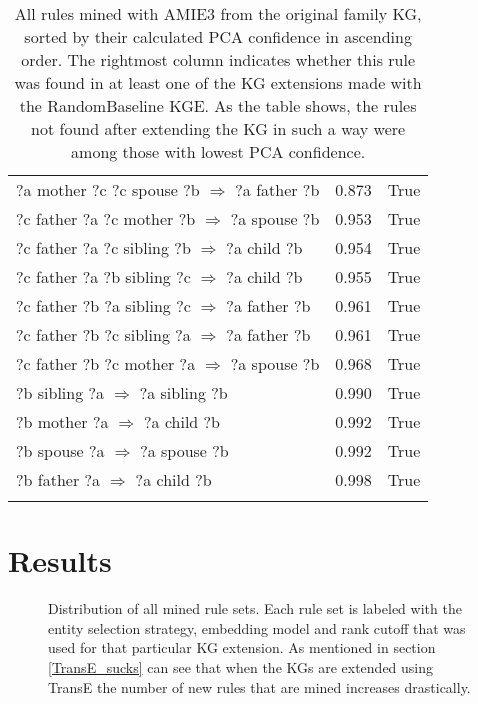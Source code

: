 \begin{longtable}{lrl}
      ?a  mother  ?c  ?c  spouse  ?b   $\Rightarrow$ ?a  father  ?b &           0.873 &                     True \\
      ?c  father  ?a  ?c  mother  ?b   $\Rightarrow$ ?a  spouse  ?b &           0.953 &                     True \\
      ?c  father  ?a  ?c  sibling  ?b   $\Rightarrow$ ?a  child  ?b &           0.954 &                     True \\
      ?c  father  ?a  ?b  sibling  ?c   $\Rightarrow$ ?a  child  ?b &           0.955 &                     True \\
     ?c  father  ?b  ?a  sibling  ?c   $\Rightarrow$ ?a  father  ?b &           0.961 &                     True \\
     ?c  father  ?b  ?c  sibling  ?a   $\Rightarrow$ ?a  father  ?b &           0.961 &                     True \\
      ?c  father  ?b  ?c  mother  ?a   $\Rightarrow$ ?a  spouse  ?b &           0.968 &                     True \\
                    ?b  sibling  ?a   $\Rightarrow$ ?a  sibling  ?b &           0.990 &                     True \\
                       ?b  mother  ?a   $\Rightarrow$ ?a  child  ?b &           0.992 &                     True \\
                      ?b  spouse  ?a   $\Rightarrow$ ?a  spouse  ?b &           0.992 &                     True \\
                       ?b  father  ?a   $\Rightarrow$ ?a  child  ?b &           0.998 &                     True \\
\bottomrule
\caption[Original rules listed family KG]{All rules mined with AMIE3 from the original family KG, sorted by their calculated PCA confidence in ascending order. The rightmost column indicates whether this rule was found in at least one of the KG extensions made with the RandomBaseline KGE. As the table shows, the rules not found after extending the KG in such a way were among those with lowest PCA confidence.}
\label{original_rules_found_by_baseline_family}
\end{longtable}


\chapter{Results}

\begin{figure}[htbp]
\centering
    \centering
    
    \caption[Dist. of all sets of mined rules.]{Distribution of all mined rule sets. Each rule set is labeled with the entity selection strategy, embedding model and rank cutoff that was used for that particular KG extension. As mentioned in section \ref{TransE_sucks} can see that when the KGs are extended using TransE the number of new rules that are mined increases drastically.}
    \label{all_sets}
\end{figure}


